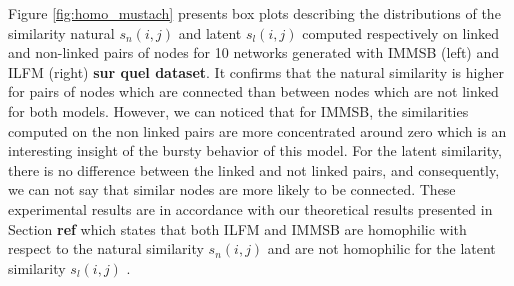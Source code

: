 Figure \ref{fig:homo_mustach} presents box plots describing  the distributions of the similarity natural $s_n(i,j)$ and latent $s_l(i,j)$ computed respectively on linked and non-linked pairs of nodes for 10 networks generated with IMMSB (left) and ILFM (right) \textbf{sur quel dataset}.  It confirms that the natural similarity is  higher for  pairs of nodes which are connected than between nodes which are not linked for both models. However, we can noticed that for IMMSB, the similarities computed on the non linked pairs are more concentrated around zero which is an interesting insight of the bursty behavior of this model. For the latent similarity,  there is no difference between the linked and not linked pairs, and consequently, we can not say that similar nodes are more likely to be connected. These experimental results are in accordance with our theoretical results presented in Section \textbf{ref} which states that both ILFM and IMMSB are homophilic with respect to the natural similarity $s_n(i,j)$ and are not homophilic for the latent similarity $s_l(i,j)$ .

